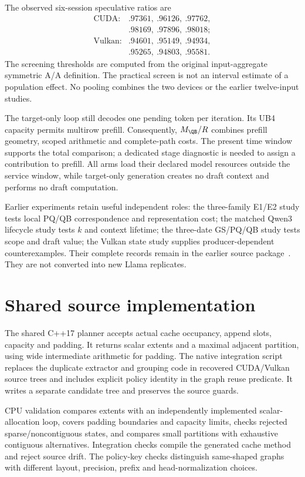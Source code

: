 The observed six-session speculative ratios are
\[
\begin{array}{ll}
\text{CUDA:}&.97361,\ .96126,\ .97762,\\
           &.98169,\ .97896,\ .98018;\\[2pt]
\text{Vulkan:}&.94601,\ .95149,\ .94934,\\
             &.95265,\ .94803,\ .95581.
\end{array}
\]
The screening thresholds are computed from the original input-aggregate symmetric A/A definition. The practical screen is not an interval estimate of a population effect. No pooling combines the two devices or the earlier twelve-input studies.

The target-only loop still decodes one pending token per iteration. Its UB4 capacity permits multirow prefill. Consequently, $M_{\QB}/R$ combines prefill geometry, scoped arithmetic and complete-path costs. The present time window supports the total comparison; a dedicated stage diagnostic is needed to assign a contribution to prefill. All arms load their declared model resources outside the service window, while target-only generation creates no draft context and performs no draft computation.

Earlier experiments retain useful independent roles: the three-family E1/E2 study tests local PQ/QB correspondence and representation cost; the matched Qwen3 lifecycle study tests $k$ and context lifetime; the three-date GS/PQ/QB study tests scope and draft value; the Vulkan state study supplies producer-dependent counterexamples. Their complete records remain in the earlier source package~\cite{paperbaseline}. They are not converted into new Llama replicates.

\section{Shared source implementation}
\label{app:shared}
The shared C++17 planner accepts actual cache occupancy, append slots, capacity and padding. It returns scalar extents and a maximal adjacent partition, using wide intermediate arithmetic for padding. The native integration script replaces the duplicate extractor and grouping code in recovered CUDA/Vulkan source trees and includes explicit policy identity in the graph reuse predicate. It writes a separate candidate tree and preserves the source guards.

CPU validation compares extents with an independently implemented scalar-allocation loop, covers padding boundaries and capacity limits, checks rejected sparse/noncontiguous states, and compares small partitions with exhaustive contiguous alternatives. Integration checks compile the generated cache method and reject source drift. The policy-key checks distinguish same-shaped graphs with different layout, precision, prefix and head-normalization choices.


